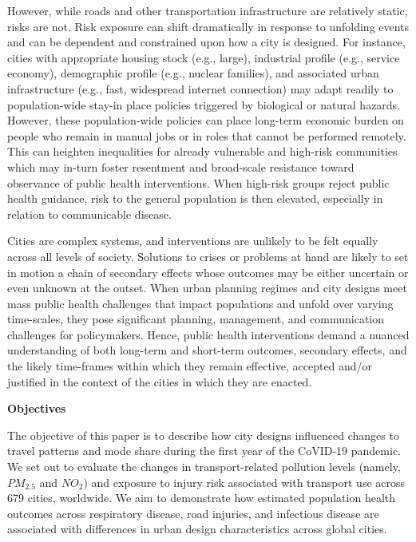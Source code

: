 \documentclass[preprint,12pt]{elsarticle}
\begin{document}
However, while roads and other transportation infrastructure are relatively static, risks are not. Risk exposure can shift dramatically in response to unfolding events and can be dependent and constrained upon how a city is designed. For instance, cities with appropriate housing stock (e.g., large), industrial profile (e.g., service economy), demographic profile (e.g., nuclear families), and associated urban infrastructure (e.g., fast, widespread internet connection) may adapt readily to population-wide stay-in place policies triggered by biological or natural hazards\cite{hale2021global}. However, these population-wide policies can place long-term economic burden on people who remain in manual jobs or in roles that cannot be performed remotely\cite{CraigWFH,Vyas2021}. This can heighten inequalities for already vulnerable and high-risk communities\cite{martin2020fighting} which may in-turn foster resentment and broad-scale resistance toward observance of public health interventions\cite{de2016sustainability}. When high-risk groups reject public health guidance, risk to the general population is then elevated, especially in relation to communicable disease\cite{koopman2005control}.

Cities are complex systems\cite{DiezRoux2015}, and interventions are unlikely to be felt equally across all levels of society. Solutions to crises or problems at hand are likely to set in motion a chain of secondary effects whose outcomes may be either uncertain or even unknown at the outset\cite{Sterman2006}. When urban planning regimes and city designs meet mass public health challenges that impact populations and unfold over varying time-scales\cite{casti2012x}, they pose significant planning, management, and communication challenges for policymakers\cite{thompson2022modelling,thompson2022framework}. Hence, public health interventions demand a nuanced understanding of both long-term and short-term  outcomes, secondary effects, and the likely time-frames within which they remain effective, accepted and/or justified in the context of the cities in which they are enacted\cite{dawson2016snakes, oliu2021sars}.

\textbf{Objectives}

The objective of this paper is to describe how city designs influenced changes to travel patterns and mode share during the first year of the CoVID-19 pandemic. We set out to evaluate the changes in transport-related pollution levels (namely, \(PM_{2.5}\) and \(NO_{2}\)) and exposure to injury risk associated with transport use across 679 cities, worldwide. We aim to demonstrate how estimated population health outcomes across respiratory disease, road injuries, and infectious disease are associated with differences in urban design characteristics across global cities.
\end{document}
